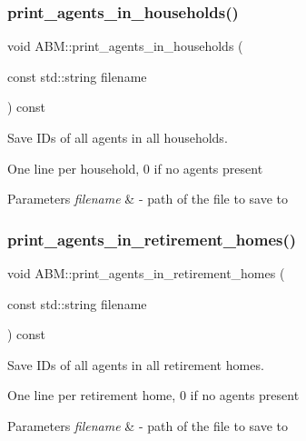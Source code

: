 \subsubsection{\texorpdfstring{print\+\_\+agents\+\_\+in\+\_\+households()}{print\_agents\_in\_households()}}
{\footnotesize\ttfamily void A\+B\+M\+::print\+\_\+agents\+\_\+in\+\_\+households (\begin{DoxyParamCaption}\item[{const std\+::string}]{filename }\end{DoxyParamCaption}) const}



Save I\+Ds of all agents in all households. 

One line per household, 0 if no agents present 
\begin{DoxyParams}{Parameters}
{\em filename} & -\/ path of the file to save to \\
\hline
\end{DoxyParams}
\mbox{\label{classABM_ab1b1192eff4a2e10f4a05d87c6e3d896}} 
\subsubsection{\texorpdfstring{print\+\_\+agents\+\_\+in\+\_\+retirement\+\_\+homes()}{print\_agents\_in\_retirement\_homes()}}
{\footnotesize\ttfamily void A\+B\+M\+::print\+\_\+agents\+\_\+in\+\_\+retirement\+\_\+homes (\begin{DoxyParamCaption}\item[{const std\+::string}]{filename }\end{DoxyParamCaption}) const}



Save I\+Ds of all agents in all retirement homes. 

One line per retirement home, 0 if no agents present 
\begin{DoxyParams}{Parameters}
{\em filename} & -\/ path of the file to save to \\
\hline
\end{DoxyParams}
\mbox{\label{classABM_ab3acbd3d496e2994367a0cfb0bdd7984}} 
